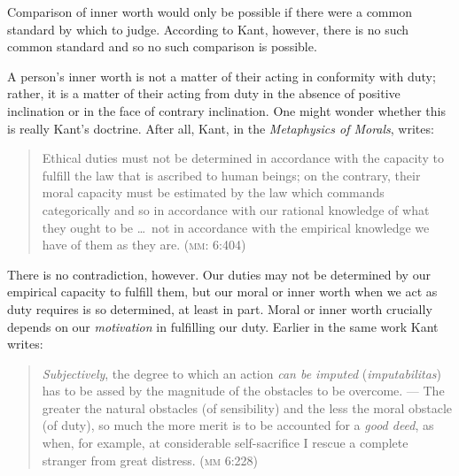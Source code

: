 \documentclass[12pt]{article}
\begin{document}
Comparison of inner worth would only be possible if there were a common standard by which to judge. According to Kant, however, there is no such common standard and so no such comparison is possible.

A person's inner worth is not a matter of their acting in conformity with duty; rather, it is a matter of their acting from duty in the absence of positive inclination or in the face of contrary inclination. %
% 	
% 
% 
One might wonder whether this is really Kant's doctrine. After all, Kant, in the \emph{Metaphysics of Morals}, writes:
\begin{quote}
	Ethical duties must not be determined in accordance with the capacity to fulfill the law that is ascribed to human beings; on the contrary, their moral capacity must be estimated by the law which commands categorically and so in accordance with our rational knowledge of what they ought to be \ldots\ not in accordance with the empirical knowledge we have of them as they are. (\textsc{mm}: 6:404)
\end{quote}
There is no contradiction, however. Our duties may not be determined by our empirical capacity to fulfill them, but our moral or inner worth when we act as duty requires is so determined, at least in part. Moral or inner worth crucially depends on our \emph{motivation} in fulfilling our duty. Earlier in the same work Kant writes:
\begin{quote}
	\emph{Subjectively}, the degree to which an action \emph{can be imputed} (\emph{imputabilitas}) has to be assed by the magnitude of the obstacles to be overcome. --- The greater the natural obstacles (of sensibility) and the less the moral obstacle (of duty), so much the more merit is to be accounted for a \emph{good deed}, as when, for example, at considerable self-sacrifice I rescue a complete stranger from great distress. (\textsc{mm} 6:228)
\end{quote}
\end{document}
